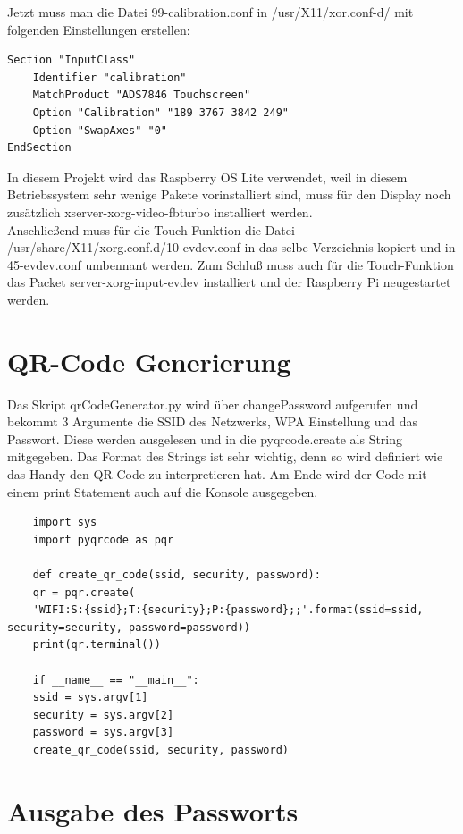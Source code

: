 \documentclass[a4paper,11pt,singlespacing]{article}
\begin{document}
    		Jetzt muss man die Datei 99-calibration.conf in /usr/X11/xor.conf-d/ mit folgenden Einstellungen erstellen:
    		\begin{lstlisting}
Section "InputClass"
	Identifier "calibration"
	MatchProduct "ADS7846 Touchscreen"
	Option "Calibration" "189 3767 3842 249"
	Option "SwapAxes" "0"
EndSection
    		\end{lstlisting}
 
			In diesem Projekt wird das Raspberry OS Lite verwendet, weil in diesem Betriebssystem sehr wenige Pakete vorinstalliert sind, muss für den Display noch zusätzlich xserver-xorg-video-fbturbo installiert werden. \\
			Anschließend muss für die Touch-Funktion die Datei /usr/share/X11/xorg.conf.d/10-evdev.conf in das selbe Verzeichnis kopiert und in 45-evdev.conf umbennant werden. Zum Schluß muss auch für die Touch-Funktion das Packet server-xorg-input-evdev installiert und der Raspberry Pi neugestartet werden.

    	\section{QR-Code Generierung}
			Das Skript qrCodeGenerator.py wird über changePassword aufgerufen und bekommt 3 Argumente die SSID des Netzwerks, WPA Einstellung und das Passwort. Diese werden ausgelesen und in die pyqrcode.create als String mitgegeben. Das Format des Strings ist sehr wichtig, denn so wird definiert wie das Handy den QR-Code zu interpretieren hat. Am Ende wird der Code mit einem print Statement auch auf die Konsole ausgegeben. \\ 



\begin{lstlisting}
	import sys
	import pyqrcode as pqr
	
	def create_qr_code(ssid, security, password):
	qr = pqr.create(
	'WIFI:S:{ssid};T:{security};P:{password};;'.format(ssid=ssid, security=security, password=password))
	print(qr.terminal())
	
	if __name__ == "__main__":
	ssid = sys.argv[1]
	security = sys.argv[2]
	password = sys.argv[3]
	create_qr_code(ssid, security, password)
\end{lstlisting}
    		
    	\section{Ausgabe des Passworts}
    		
\end{document}
